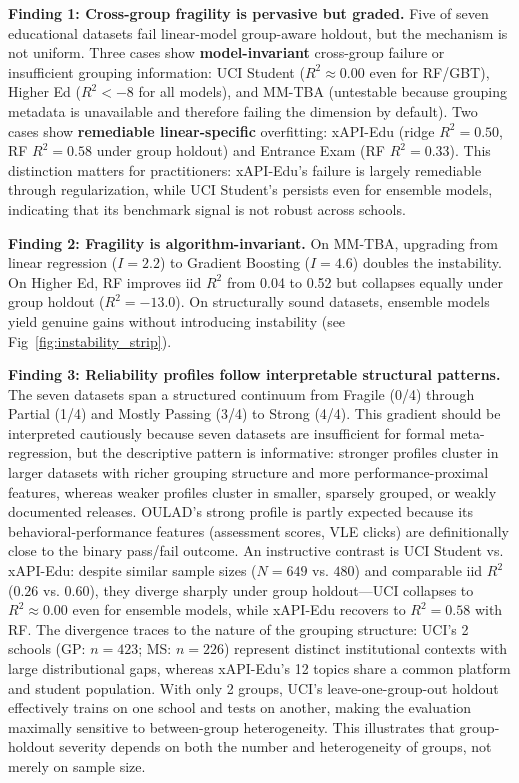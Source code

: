 \documentclass[10pt,letterpaper]{article}
\begin{document}
\textbf{Finding 1: Cross-group fragility is pervasive but graded.} Five of seven educational datasets fail linear-model group-aware holdout, but the mechanism is not uniform. Three cases show \textbf{model-invariant} cross-group failure or insufficient grouping information: UCI Student ($R^2 \approx 0.00$ even for RF/GBT), Higher Ed ($R^2 < -8$ for all models), and MM-TBA (untestable because grouping metadata is unavailable and therefore failing the dimension by default). Two cases show \textbf{remediable linear-specific} overfitting: xAPI-Edu (ridge $R^2 = 0.50$, RF $R^2 = 0.58$ under group holdout) and Entrance Exam (RF $R^2 = 0.33$). This distinction matters for practitioners: xAPI-Edu's failure is largely remediable through regularization, while UCI Student's persists even for ensemble models, indicating that its benchmark signal is not robust across schools.

\textbf{Finding 2: Fragility is algorithm-invariant.} On MM-TBA, upgrading from linear regression ($I = 2.2$) to Gradient Boosting ($I = 4.6$) doubles the instability. On Higher Ed, RF improves iid $R^2$ from 0.04 to 0.52 but collapses equally under group holdout ($R^2 = -13.0$). On structurally sound datasets, ensemble models yield genuine gains without introducing instability (see Fig~\ref{fig:instability_strip}).

\textbf{Finding 3: Reliability profiles follow interpretable structural patterns.} The seven datasets span a structured continuum from Fragile (0/4) through Partial (1/4) and Mostly Passing (3/4) to Strong (4/4). This gradient should be interpreted cautiously because seven datasets are insufficient for formal meta-regression, but the descriptive pattern is informative: stronger profiles cluster in larger datasets with richer grouping structure and more performance-proximal features, whereas weaker profiles cluster in smaller, sparsely grouped, or weakly documented releases. OULAD's strong profile is partly expected because its behavioral-performance features (assessment scores, VLE clicks) are definitionally close to the binary pass/fail outcome. An instructive contrast is UCI Student vs. xAPI-Edu: despite similar sample sizes ($N = 649$ vs. $480$) and comparable iid $R^2$ ($0.26$ vs. $0.60$), they diverge sharply under group holdout---UCI collapses to $R^2 \approx 0.00$ even for ensemble models, while xAPI-Edu recovers to $R^2 = 0.58$ with RF. The divergence traces to the nature of the grouping structure: UCI's 2 schools (GP: $n=423$; MS: $n=226$) represent distinct institutional contexts with large distributional gaps, whereas xAPI-Edu's 12 topics share a common platform and student population. With only 2 groups, UCI's leave-one-group-out holdout effectively trains on one school and tests on another, making the evaluation maximally sensitive to between-group heterogeneity. This illustrates that group-holdout severity depends on both the number and heterogeneity of groups, not merely on sample size.
\end{document}
